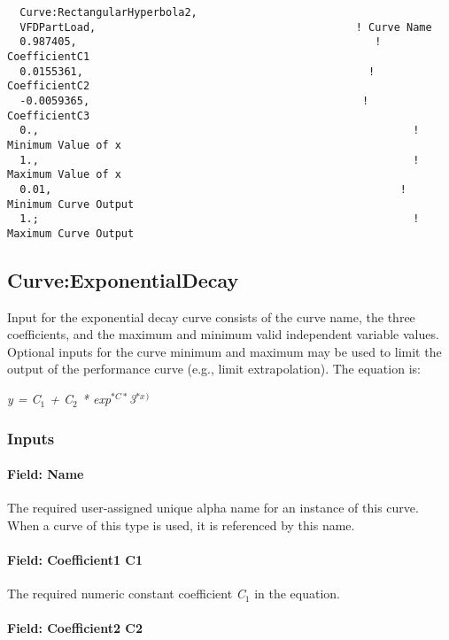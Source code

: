\begin{lstlisting}
  Curve:RectangularHyperbola2,
  VFDPartLoad,                                         ! Curve Name
  0.987405,                                               ! CoefficientC1
  0.0155361,                                             ! CoefficientC2
  -0.0059365,                                           ! CoefficientC3
  0.,                                                           ! Minimum Value of x
  1.,                                                           ! Maximum Value of x
  0.01,                                                       ! Minimum Curve Output
  1.;                                                           ! Maximum Curve Output
\end{lstlisting}

\subsection{Curve:ExponentialDecay}\label{curveexponentialdecay}

Input for the exponential decay curve consists of the curve name, the three coefficients, and the maximum and minimum valid independent variable values. Optional inputs for the curve minimum and maximum may be used to limit the output of the performance curve (e.g., limit extrapolation). The equation is:

\emph{y = C\(_{1}\) + C\(_{2}\) * exp}\(^{*C*}\)\emph{3\(^{*x}\)}\(^{)}\)

\subsubsection{Inputs}\label{inputs-17-005}

\paragraph{Field: Name}\label{field-name-17-004}

The required user-assigned unique alpha name for an instance of this curve. When a curve of this type is used, it is referenced by this name.

\paragraph{Field: Coefficient1 C1}\label{field-coefficient1-c1-4}

The required numeric constant coefficient \emph{C\(_{1}\)} in the equation.

\paragraph{Field: Coefficient2 C2}\label{field-coefficient2-c2-4}

